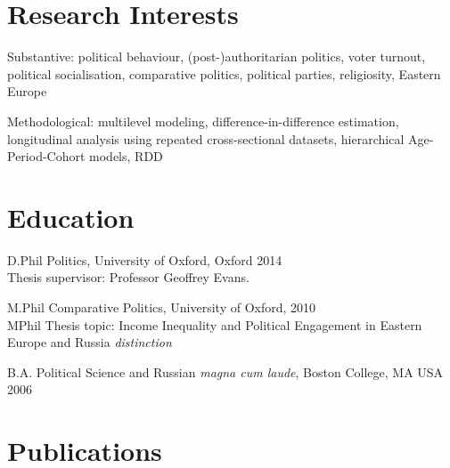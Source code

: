 \documentclass[12pt,letterpaper]{report}
\newcommand{\listitemspace}{0.25em}
\renewenvironment{itemize}
{\begin{list}{}{\setlength{\leftmargin}{0em}
                \setlength{\parskip}{0em}
                \setlength{\itemsep}{\listitemspace}
                \setlength{\parsep}{\listitemspace}}}
{\end{list}}
\begin{document}
    \section*{Research Interests}

    \begin{itemize}

        \item Substantive: political behaviour, (post-)authoritarian politics, voter turnout, political socialisation, comparative politics, political parties, religiosity, Eastern Europe
        \item Methodological: multilevel modeling, difference-in-difference estimation, longitudinal analysis using repeated cross-sectional datasets, hierarchical Age-Period-Cohort models, RDD
    \end{itemize}

    \section*{Education}

\begin{tablist}
	
	\item[D.Phil] \tab{}Politics, University of Oxford, Oxford 2014\\
	Thesis supervisor: Professor Geoffrey Evans. \\
	
	\item[M.Phil]  \tab{}Comparative Politics, University of Oxford, 2010 \\
	MPhil Thesis topic: Income Inequality and Political Engagement in Eastern Europe and Russia \textit{distinction}
\item[B.A.]  \tab{}Political Science and Russian \textit{magna cum laude}, Boston College, MA USA 2006

\end{tablist}


    \section*{Publications}
\end{document}
